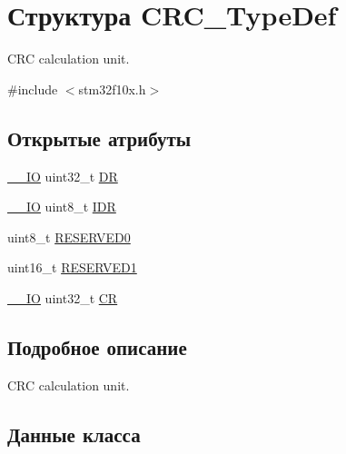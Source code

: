 \hypertarget{struct_c_r_c___type_def}{}\section{Структура C\+R\+C\+\_\+\+Type\+Def}
\label{struct_c_r_c___type_def}


C\+RC calculation unit.  




{\ttfamily \#include $<$stm32f10x.\+h$>$}

\subsection*{Открытые атрибуты}
\begin{DoxyCompactItemize}
\item 
\mbox{\hyperlink{group___c_m_s_i_s___c_m3__core__definitions_gaec43007d9998a0a0e01faede4133d6be}{\+\_\+\+\_\+\+IO}} uint32\+\_\+t \mbox{\hyperlink{struct_c_r_c___type_def_a50cb22870dbb9001241cec694994e5ef}{DR}}
\item 
\mbox{\hyperlink{group___c_m_s_i_s___c_m3__core__definitions_gaec43007d9998a0a0e01faede4133d6be}{\+\_\+\+\_\+\+IO}} uint8\+\_\+t \mbox{\hyperlink{struct_c_r_c___type_def_ad84e8694cd4b5375ee533c2d875c3b5a}{I\+DR}}
\item 
uint8\+\_\+t \mbox{\hyperlink{struct_c_r_c___type_def_a70dfd1730dba65041550ef55a44db87c}{R\+E\+S\+E\+R\+V\+E\+D0}}
\item 
uint16\+\_\+t \mbox{\hyperlink{struct_c_r_c___type_def_a8b205c6e25b1808ac016db2356b3021d}{R\+E\+S\+E\+R\+V\+E\+D1}}
\item 
\mbox{\hyperlink{group___c_m_s_i_s___c_m3__core__definitions_gaec43007d9998a0a0e01faede4133d6be}{\+\_\+\+\_\+\+IO}} uint32\+\_\+t \mbox{\hyperlink{struct_c_r_c___type_def_af33fa5c173e1c102e6d0242fe60e569f}{CR}}
\end{DoxyCompactItemize}


\subsection{Подробное описание}
C\+RC calculation unit. 

\subsection{Данные класса}
\mbox{\label{struct_c_r_c___type_def_af33fa5c173e1c102e6d0242fe60e569f}} 
